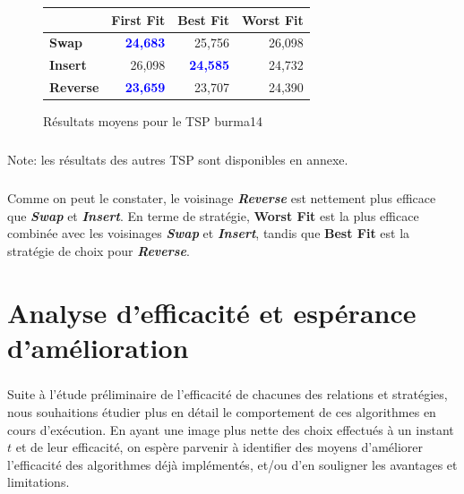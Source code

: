 \documentclass[a4paper,10pt]{report}
\begin{document}
\begin{figure}[H]
  \begin{center}
    \begin{tabular}{|l|r|r|r|}
      \hline
      &		\textbf{First Fit}&	\textbf{Best Fit}&	\textbf{Worst
Fit}\\\hline
      \textbf{Swap}&
	  \textbf{\textcolor{blue}{24,683}}&
	  25,756&
	  26,098\\\hline
      \textbf{Insert}&
	  26,098&
	  \textbf{\textcolor{blue}{24,585}}&
	  24,732\\\hline
      \textbf{Reverse}&
	  \textbf{\textcolor{blue}{23,659}}&
	  23,707&
	  24,390\\\hline
    \end{tabular}
    \label{burma14-results}
    \caption{Résultats moyens pour le TSP burma14}
  \end{center}
\end{figure}

\paragraph{}
Note: les résultats des autres TSP sont disponibles en annexe.

\paragraph{}
  Comme on peut le constater, le voisinage \textbf{\textit{Reverse}} est
nettement plus efficace que \textbf{\textit{Swap}} et \textbf{\textit{Insert}}.
En terme de stratégie, \textbf{Worst Fit} est la plus efficace combinée avec les
voisinages \textbf{\textit{Swap}} et \textbf{\textit{Insert}}, tandis que
\textbf{Best Fit} est la stratégie de choix pour \textbf{\textit{Reverse}}.

\chapter{Analyse d'efficacité et espérance d'amélioration}

\paragraph{}%
  Suite à l'étude préliminaire de l'efficacité de chacunes des relations et
stratégies, nous souhaitions étudier plus en détail le comportement de ces
algorithmes en cours d'exécution. En ayant une image plus nette des choix
effectués à un instant $t$ et de leur efficacité, on espère parvenir à
identifier des moyens d'améliorer l'efficacité des algorithmes déjà implémentés,
et/ou d'en souligner les avantages et limitations.
\end{document}

